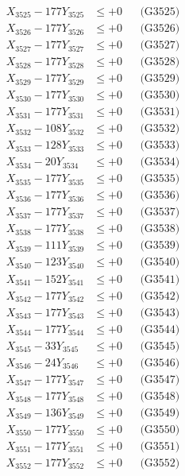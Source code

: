 \documentclass[a4paper,10pt]{article}
\begin{document}
{\begin{align}
X_{3525} - 177Y_{3525} &\leq +0 && \text{(G3525)} \\
X_{3526} - 177Y_{3526} &\leq +0 && \text{(G3526)} \\
X_{3527} - 177Y_{3527} &\leq +0 && \text{(G3527)} \\
X_{3528} - 177Y_{3528} &\leq +0 && \text{(G3528)} \\
X_{3529} - 177Y_{3529} &\leq +0 && \text{(G3529)} \\
X_{3530} - 177Y_{3530} &\leq +0 && \text{(G3530)} \\
\allowbreak
X_{3531} - 177Y_{3531} &\leq +0 && \text{(G3531)} \\
X_{3532} - 108Y_{3532} &\leq +0 && \text{(G3532)} \\
X_{3533} - 128Y_{3533} &\leq +0 && \text{(G3533)} \\
X_{3534} - 20Y_{3534} &\leq +0 && \text{(G3534)} \\
X_{3535} - 177Y_{3535} &\leq +0 && \text{(G3535)} \\
X_{3536} - 177Y_{3536} &\leq +0 && \text{(G3536)} \\
X_{3537} - 177Y_{3537} &\leq +0 && \text{(G3537)} \\
X_{3538} - 177Y_{3538} &\leq +0 && \text{(G3538)} \\
X_{3539} - 111Y_{3539} &\leq +0 && \text{(G3539)} \\
X_{3540} - 123Y_{3540} &\leq +0 && \text{(G3540)} \\
\allowbreak
X_{3541} - 152Y_{3541} &\leq +0 && \text{(G3541)} \\
X_{3542} - 177Y_{3542} &\leq +0 && \text{(G3542)} \\
X_{3543} - 177Y_{3543} &\leq +0 && \text{(G3543)} \\
X_{3544} - 177Y_{3544} &\leq +0 && \text{(G3544)} \\
X_{3545} - 33Y_{3545} &\leq +0 && \text{(G3545)} \\
X_{3546} - 24Y_{3546} &\leq +0 && \text{(G3546)} \\
X_{3547} - 177Y_{3547} &\leq +0 && \text{(G3547)} \\
X_{3548} - 177Y_{3548} &\leq +0 && \text{(G3548)} \\
X_{3549} - 136Y_{3549} &\leq +0 && \text{(G3549)} \\
X_{3550} - 177Y_{3550} &\leq +0 && \text{(G3550)} \\
\allowbreak
X_{3551} - 177Y_{3551} &\leq +0 && \text{(G3551)} \\
X_{3552} - 177Y_{3552} &\leq +0 && \text{(G3552)} \\

\end{align}}
\end{document}

